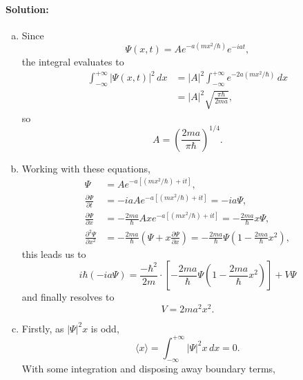 \documentclass{article}
\begin{document}
\paragraph{Solution:} \begin{enumerate}[(a)]
  \item Since \begin{equation*}
      \Psi(x, t) = Ae^{-a(mx^2/\hbar)}e^{-iat},
    \end{equation*} the integral evaluates to \begin{align*}
      \int_{-\infty}^{+\infty} |\Psi(x, t)|^2 \,dx
      &= |A|^2 \int_{-\infty}^{+\infty} e^{-2a(mx^2/\hbar)} \,dx \\
      &= |A|^2 \sqrt{\frac{\pi\hbar}{2ma}},
    \end{align*} so \begin{equation*}
      A = \left(\frac{2ma}{\pi\hbar}\right)^{1/4}.
    \end{equation*}
  \item Working with these equations, \begin{align*}
      \Psi &= Ae^{-a[(mx^2/\hbar) + it]}, \\
      \frac{\partial\Psi}{\partial t}
           &= -iaAe^{-a[(mx^2/\hbar) + it]} = -ia\Psi, \\
      \frac{\partial\Psi}{\partial x}
           &= -\frac{2ma}{\hbar}Axe^{-a[(mx^2/\hbar) + it]}
           = -\frac{2ma}{\hbar}x\Psi, \\
      \frac{\partial^2\Psi}{\partial x^2}
           &= -\frac{2ma}{\hbar}\left(
            \Psi + x\frac{\partial\Psi}{\partial x}
           \right)
           = -\frac{2ma}{\hbar}\Psi\left(
             1 - \frac{2ma}{\hbar}x^2
           \right),
    \end{align*} this leads us to \begin{equation*}
      i\hbar(-ia\Psi) = \frac{-\hbar^2}{2m} \cdot \left[
        -\frac{2ma}{\hbar}\Psi\left(1 - \frac{2ma}{\hbar}x^2\right)
      \right] + V\Psi
    \end{equation*} and finally resolves to \begin{equation*}
      V = 2ma^2x^2.
    \end{equation*}
  \item Firstly, as $|\Psi|^2x$ is odd, \begin{equation*}
    \langle x \rangle
    = \int_{-\infty}^{+\infty} |\Psi|^2x \,dx
    = 0.
  \end{equation*} With some integration and disposing away boundary terms,
  \begin{equation*}

\end{equation*}
\end{enumerate}
\end{document}
